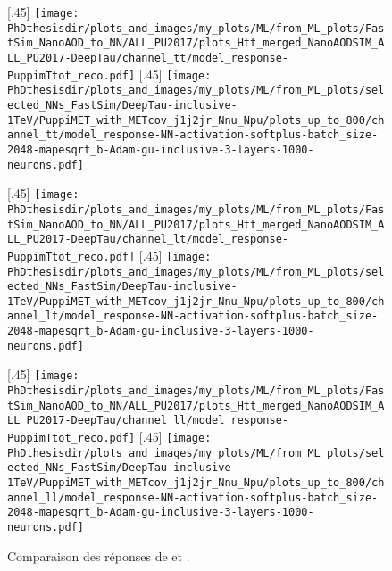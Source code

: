 \begin{figure}[p]
\centering

[.45\textwidth]
{\texttt{[image: \\PhDthesisdir/plots\_and\_images/my\_plots/ML/from\_ML\_plots/FastSim\_NanoAOD\_to\_NN/ALL\_PU2017/plots\_Htt\_merged\_NanoAODSIM\_ALL\_PU2017-DeepTau/channel\_tt/model\_response-PuppimTtot\_reco.pdf]}\vspace{-.5\baselineskip}}
\hfill
{}[.45\textwidth]
{\texttt{[image: \\PhDthesisdir/plots\_and\_images/my\_plots/ML/from\_ML\_plots/selected\_NNs\_FastSim/DeepTau-inclusive-1TeV/PuppiMET\_with\_METcov\_j1j2jr\_Nnu\_Npu/plots\_up\_to\_800/channel\_tt/model\_response-NN-activation-softplus-batch\_size-2048-mapesqrt\_b-Adam-gu-inclusive-3-layers-1000-neurons.pdf]}\vspace{-.5\baselineskip}}

[.45\textwidth]
{\texttt{[image: \\PhDthesisdir/plots\_and\_images/my\_plots/ML/from\_ML\_plots/FastSim\_NanoAOD\_to\_NN/ALL\_PU2017/plots\_Htt\_merged\_NanoAODSIM\_ALL\_PU2017-DeepTau/channel\_lt/model\_response-PuppimTtot\_reco.pdf]}\vspace{-.5\baselineskip}}
\hfill{}[.45\textwidth]
{\texttt{[image: \\PhDthesisdir/plots\_and\_images/my\_plots/ML/from\_ML\_plots/selected\_NNs\_FastSim/DeepTau-inclusive-1TeV/PuppiMET\_with\_METcov\_j1j2jr\_Nnu\_Npu/plots\_up\_to\_800/channel\_lt/model\_response-NN-activation-softplus-batch\_size-2048-mapesqrt\_b-Adam-gu-inclusive-3-layers-1000-neurons.pdf]}\vspace{-.5\baselineskip}}

[.45\textwidth]
{\texttt{[image: \\PhDthesisdir/plots\_and\_images/my\_plots/ML/from\_ML\_plots/FastSim\_NanoAOD\_to\_NN/ALL\_PU2017/plots\_Htt\_merged\_NanoAODSIM\_ALL\_PU2017-DeepTau/channel\_ll/model\_response-PuppimTtot\_reco.pdf]}\vspace{-.5\baselineskip}}
\hfill
{}[.45\textwidth]
{\texttt{[image: \\PhDthesisdir/plots\_and\_images/my\_plots/ML/from\_ML\_plots/selected\_NNs\_FastSim/DeepTau-inclusive-1TeV/PuppiMET\_with\_METcov\_j1j2jr\_Nnu\_Npu/plots\_up\_to\_800/channel\_ll/model\_response-NN-activation-softplus-batch\_size-2048-mapesqrt\_b-Adam-gu-inclusive-3-layers-1000-neurons.pdf]}\vspace{-.5\baselineskip}}

\caption{Comparaison des réponses de \mml et \mTtot.}
\label{fig-BpprimevsMTTOT-resp}
\end{figure}
